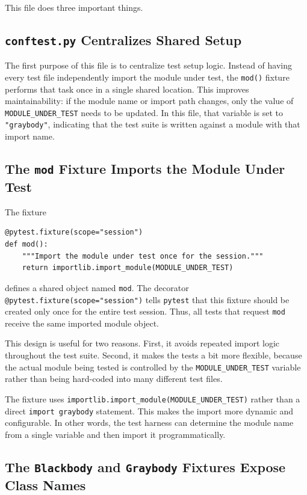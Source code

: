 This file does three important things.

\subsection{\texttt{conftest.py} Centralizes Shared Setup}

The first purpose of this file is to centralize test setup logic. Instead of having every test file independently import the module under test, the \texttt{mod()} fixture performs that task once in a single shared location. This improves maintainability: if the module name or import path changes, only the value of \texttt{MODULE\_UNDER\_TEST} needs to be updated. In this file, that variable is set to \texttt{"graybody"}, indicating that the test suite is written against a module with that import name.

\subsection{The \texttt{mod} Fixture Imports the Module Under Test}

The fixture

\begin{verbatim}
@pytest.fixture(scope="session")
def mod():
    """Import the module under test once for the session."""
    return importlib.import_module(MODULE_UNDER_TEST)
\end{verbatim}

defines a shared object named \texttt{mod}. The decorator \texttt{@pytest.fixture(scope="session")} tells \texttt{pytest} that this fixture should be created only once for the entire test session. Thus, all tests that request \texttt{mod} receive the same imported module object.

This design is useful for two reasons. First, it avoids repeated import logic throughout the test suite. Second, it makes the tests a bit more flexible, because the actual module being tested is controlled by the \texttt{MODULE\_UNDER\_TEST} variable rather than being hard-coded into many different test files.

The fixture uses \texttt{importlib.import\_module(MODULE\_UNDER\_TEST)} rather than a direct \texttt{import graybody} statement. This makes the import more dynamic and configurable. In other words, the test harness can determine the module name from a single variable and then import it programmatically.

\subsection{The \texttt{Blackbody} and \texttt{Graybody} Fixtures Expose Class Names}


